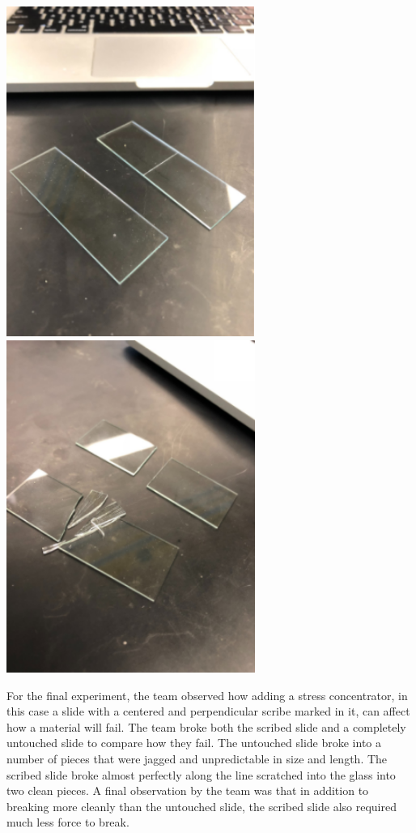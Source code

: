 \documentclass{article}
\begin{document}
\begin{center}
\includegraphics[width=230pt]{GlassBefore.png}
\includegraphics[width=230pt]{GlassAfter.png}
\end{center}

	For the final experiment, the team observed how adding a stress concentrator, in this case a slide with a centered and perpendicular scribe marked in it, can affect how a material will fail. The team broke both the scribed slide and a completely untouched slide to compare how they fail.  The untouched slide broke into a number of pieces that were jagged and unpredictable in size and length. The scribed slide broke almost perfectly along the line scratched into the glass into two clean pieces. A final observation by the team was that in addition to breaking more cleanly than the untouched slide, the scribed slide also required much less force to break.
\end{document}
